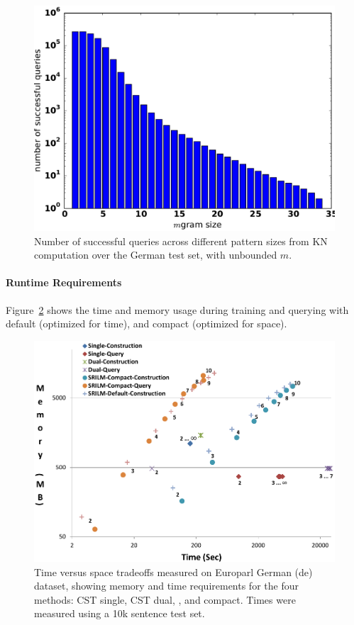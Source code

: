 \begin{figure}
\includegraphics[width=\columnwidth]{figures/german_pattern_size.pdf}
\caption{Number of successful queries across different pattern sizes from KN computation over the German test set, with unbounded $m$.}
\label{fig:germanpattern}
\end{figure}

\paragraph{Runtime Requirements}
Figure~\ref{figure:space-time} shows the time and memory usage during training and querying with \SRILM default (optimized for time), and compact (optimized for space). 

\begin{figure}
\includegraphics[width=\columnwidth]{figures/Time-Space.pdf}
\caption{Time versus space tradeoffs measured on Europarl German (de) dataset, showing memory and time requirements for the four methods: CST single, CST dual, \SRILM, and \SRILM compact. Times were measured using a 10k sentence test set.}
\label{figure:space-time}
\end{figure}





